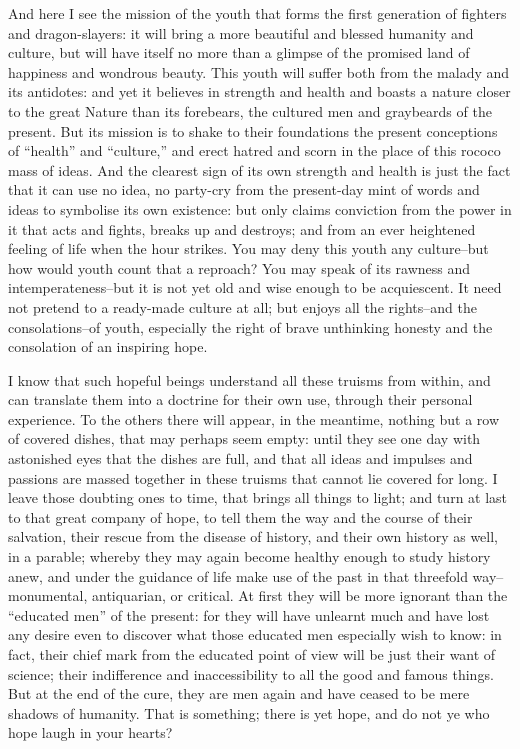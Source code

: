 And here I see the mission of the youth that forms the first
generation of fighters and dragon-slayers: it will bring a more
beautiful and blessed humanity and culture, but will have itself no
more than a glimpse of the promised land of happiness and wondrous
beauty. This youth will suffer both from the malady and its
antidotes: and yet it believes in strength and health and boasts a
nature closer to the great Nature than its forebears, the cultured
men and graybeards of the present. But its mission is to shake to
their foundations the present conceptions of \enquote{health} and \enquote{culture,}
and erect hatred and scorn in the place of this rococo mass of ideas.
And the clearest sign of its own strength and health is just the fact
that it can use no idea, no party-cry from the present-day mint of
words and ideas to symbolise its own existence: but only claims
conviction from the power in it that acts and fights, breaks up and
destroys; and from an ever heightened feeling of life when the hour
strikes. You may deny this youth any culture--but how would youth
count that a reproach? You may speak of its rawness and
intemperateness--but it is not yet old and wise enough to be
acquiescent. It need not pretend to a ready-made culture at all; but
enjoys all the rights--and the consolations--of youth, especially the
right of brave unthinking honesty and the consolation of an inspiring
hope.

I know that such hopeful beings understand all these truisms from
within, and can translate them into a doctrine for their own use,
through their personal experience. To the others there will appear,
in the meantime, nothing but a row of covered dishes, that may
perhaps seem empty: until they see one day with astonished eyes that
the dishes are full, and that all ideas and impulses and passions are
massed together in these truisms that cannot lie covered for long. I
leave those doubting ones to time, that brings all things to light;
and turn at last to that great company of hope, to tell them the way
and the course of their salvation, their rescue from the disease of
history, and their own history as well, in a parable; whereby they
may again become healthy enough to study history anew, and under the
guidance of life make use of the past in that threefold
way--monumental, antiquarian, or critical. At first they will be more
ignorant than the \enquote{educated men} of the present: for they will have
unlearnt much and have lost any desire even to discover what those
educated men especially wish to know: in fact, their chief mark from
the educated point of view will be just their want of science; their
indifference and inaccessibility to all the good and famous things.
But at the end of the cure, they are men again and have ceased to be
mere shadows of humanity. That is something; there is yet hope, and
do not ye who hope laugh in your hearts?

